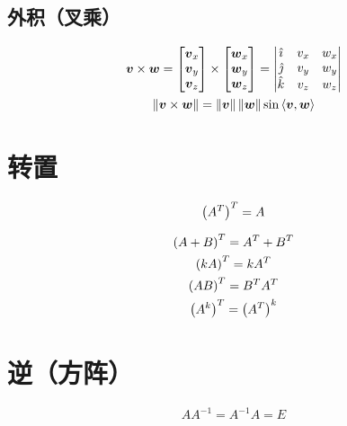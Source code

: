 \documentclass{article}
\begin{document}
\subsection{外积（叉乘）}

\[\begin{gathered}
        \boldsymbol v\times\boldsymbol w=
        \begin{bmatrix}\boldsymbol v_x\\\boldsymbol v_y\\\boldsymbol v_z\end{bmatrix}\times
        \begin{bmatrix}\boldsymbol w_x\\\boldsymbol w_y\\\boldsymbol w_z\end{bmatrix}=
        \begin{vmatrix}
            \hat\imath & v_x & w_x \\
            \hat\jmath & v_y & w_y \\
            \hat k     & v_z & w_z
        \end{vmatrix}\\
        \left\Vert\boldsymbol v\times\boldsymbol w\right\Vert=
        \left\Vert\boldsymbol v\right\Vert\left\Vert\boldsymbol w\right\Vert
        \sin\left<\boldsymbol v,\boldsymbol w\right>
    \end{gathered}\]

\section{转置}

\begin{definition}
    \[\left(A^T\right)^T=A\]
\end{definition}

\[\begin{gathered}
        \left(A+B\right)^T=A^T+B^T\\
        \left(kA\right)^T=kA^T\\
        \left(AB\right)^T=B^TA^T\\
        \left(A^k\right)^T=\left(A^T\right)^k\\
    \end{gathered}\]

\section{逆（方阵）}

\begin{definition}
    \[AA^{-1}=A^{-1}A=E\]
\end{definition}
\end{document}
